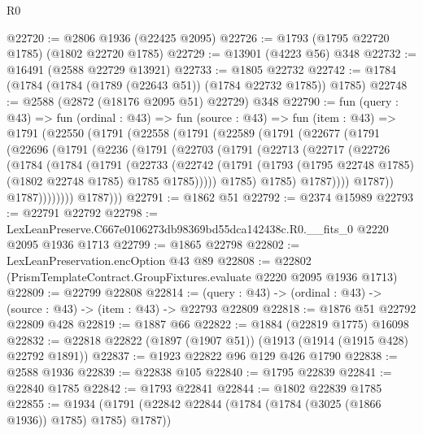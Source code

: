 \begin{lexlean}{R0}
\begin{coremodule}
@22720 := @2806 @1936 (@22425 @2095)
@22726 := @1793 (@1795 @22720 @1785) (@1802 @22720 @1785)
@22729 := @13901 (@4223 @56) @348
@22732 := @16491 (@2588 @22729 @13921)
@22733 := @1805 @22732
@22742 := @1784 (@1784 (@1784 (@1789 (@22643 @51)) (@1784 @22732 @1785)) @1785)
@22748 := @2588 (@2872 (@18176 @2095 @51) @22729) @348
@22790 := fun (query : @43) =>
  fun (ordinal : @43) =>
  fun (source : @43) =>
  fun (item : @43) =>
  @1791
    (@22550
      (@1791
        (@22558
          (@1791
            (@22589
              (@1791
                (@22677
                  (@1791
                    (@22696
                      (@1791
                        (@2236
                          (@1791
                            (@22703
                              (@1791
                                (@22713
                                  (@22717
                                    (@22726
                                      (@1784
                                        (@1784
                                          (@1791
                                            (@22733
                                              (@22742
                                                (@1791
                                                  (@1793
                                                    (@1795 @22748 @1785)
                                                    (@1802 @22748 @1785)
                                                    @1785
                                                    @1785)))))
                                          @1785)
                                        @1785)
                                      @1787))))
                              @1787))
                          @1787))))))))
          @1787)))
@22791 := @1862 @51
@22792 := @2374 @15989
@22793 := @22791 @22792
@22798 := LexLeanPreserve.C667e0106273db98369bd55dca142438c.R0.__fits_0 @2220 @2095 @1936 @1713
@22799 := @1865 @22798
@22802 := LexLeanPreservation.encOption @43 @89
@22808 := @22802 (PrismTemplateContract.GroupFixtures.evaluate @2220 @2095 @1936 @1713)
@22809 := @22799 @22808
@22814 := (query : @43) -> (ordinal : @43) -> (source : @43) -> (item : @43) -> @22793 @22809
@22818 := @1876 @51 @22792 @22809 @428
@22819 := @1887 @66
@22822 := @1884 (@22819 @1775) @16098
@22832 := @22818 @22822 (@1897 (@1907 @51)) (@1913 (@1914 (@1915 @428) @22792 @1891))
@22837 := @1923 @22822 @96 @129 @426 @1790
@22838 := @2588 @1936
@22839 := @22838 @105
@22840 := @1795 @22839
@22841 := @22840 @1785
@22842 := @1793 @22841
@22844 := @1802 @22839 @1785
@22855 := @1934 (@1791 (@22842 @22844 (@1784 (@1784 (@3025 (@1866 @1936)) @1785) @1785) @1787))

\end{coremodule}
\end{lexlean}
